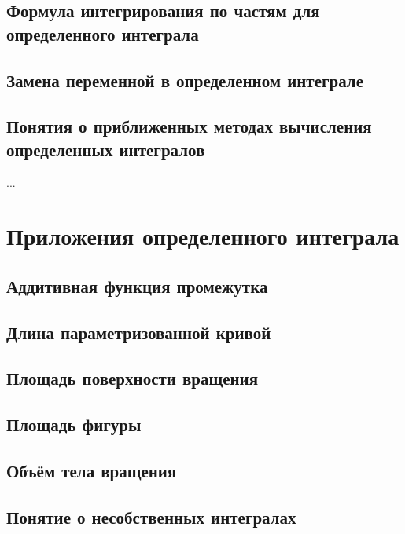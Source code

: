 \subsection{Формула интегрирования по частям для определенного интеграла}
\subsection{Замена переменной в определенном интеграле}
\subsection{Понятия о приближенных методах вычисления определенных интегралов}
...

\section{Приложения определенного интеграла}
\subsection{Аддитивная функция промежутка}
\subsection{Длина параметризованной кривой} 
\subsection{Площадь поверхности вращения}
\subsection{Площадь фигуры}
\subsection{Объём тела вращения}
\subsection{Понятие о несобственных интегралах}

